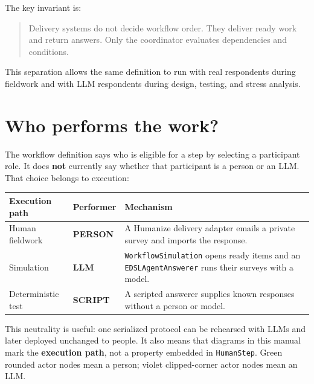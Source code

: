 \documentclass[
  10pt,
]{report}
\begin{document}
The key invariant is:

\begin{quote}
Delivery systems do not decide workflow order. They deliver ready work
and return answers. Only the coordinator evaluates dependencies and
conditions.
\end{quote}

This separation allows the same definition to run with real respondents
during fieldwork and with LLM respondents during design, testing, and
stress analysis.

\section{Who performs the work?}\label{who-performs-the-work}

The workflow definition says who is eligible for a step by selecting a
participant role. It does \textbf{not} currently say whether that
participant is a person or an LLM. That choice belongs to execution:

\begin{longtable}[]{@{}
  >{\raggedright\arraybackslash}p{}
  >{\raggedright\arraybackslash}p{}
  >{\raggedright\arraybackslash}p{}@{}}
\toprule\noalign{}
\begin{minipage}[b]{\linewidth}\raggedright
Execution path
\end{minipage} & \begin{minipage}[b]{\linewidth}\raggedright
Performer
\end{minipage} & \begin{minipage}[b]{\linewidth}\raggedright
Mechanism
\end{minipage} \\
\midrule\noalign{}
\endhead
\bottomrule\noalign{}
\endlastfoot
Human fieldwork & \textbf{PERSON} & A Humanize delivery adapter emails a
private survey and imports the response. \\
Simulation & \textbf{LLM} & \texttt{WorkflowSimulation} opens ready
items and an \texttt{EDSLAgentAnswerer} runs their surveys with a
model. \\
Deterministic test & \textbf{SCRIPT} & A scripted answerer supplies
known responses without a person or model. \\
\end{longtable}

This neutrality is useful: one serialized protocol can be rehearsed with
LLMs and later deployed unchanged to people. It also means that diagrams
in this manual mark the \textbf{execution path}, not a property embedded
in \texttt{HumanStep}. Green rounded actor nodes mean a person; violet
clipped-corner actor nodes mean an LLM.
\end{document}
